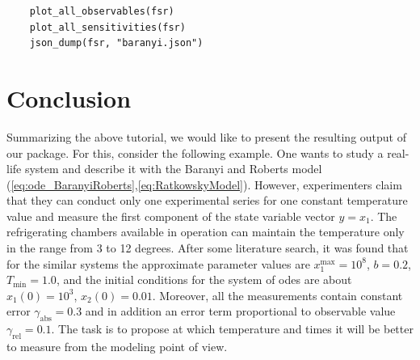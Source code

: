 \documentclass[10pt,A4paper]{article}
\begin{document}
\begin{verbatim}
    plot_all_observables(fsr)
    plot_all_sensitivities(fsr)
    json_dump(fsr, "baranyi.json")
\end{verbatim}
%
%
%
\section*{Conclusion}
Summarizing the above tutorial, we would like to present the resulting output of our package.
For this, consider the following example.
One wants to study a real-life system and describe it with the Baranyi and Roberts model (\ref{eq:ode_BaranyiRoberts},\ref{eq:RatkowskyModel}).
However, experimenters claim that they can conduct only one experimental series for one constant temperature value and measure the first component of the state variable vector $y = x_1$.
The refrigerating chambers available in operation can maintain the temperature only in the range from 3 to 12 degrees.
After some literature search, it was found that for the similar systems the approximate parameter values are $x_1^\text{max}=10^8$, $b=0.2$, $T_\text{min}=1.0$,
and the initial conditions for the system of \acp{ode} are about $x_1(0) = 10^3$, $x_2(0)=0.01$.
Moreover, all the measurements contain constant error $\gamma_\text{abs}=0.3$ and in addition an error term proportional to observable value $\gamma_\text{rel}=0.1$.
The task is to propose at which temperature and times it will be better to measure from the modeling point of view.
\end{document}
